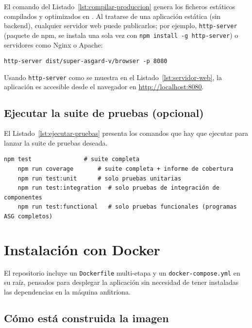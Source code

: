 \documentclass[../main.tex]{subfiles}
\begin{document}
El comando del Listado~\ref{lst:compilar-produccion} genera los ficheros estáticos compilados y optimizados en . Al tratarse de una aplicación estática (sin backend), cualquier servidor web puede publicarlos; por ejemplo, \texttt{http-server} (paquete de npm, se instala una sola vez con \texttt{npm install -g http-server}) o servidores como Nginx o Apache:

\begin{lstlisting}[caption={Comando para iniciar un servidor web.},label={lst:servidor-web}]
	http-server dist/super-asgard-v/browser -p 8080
\end{lstlisting}

Usando \texttt{http-server} como se muestra en el Listado~\ref{lst:servidor-web}, la aplicación es accesible desde el navegador en \url{http://localhost:8080}.

\subsection{Ejecutar la suite de pruebas (opcional)}

El Listado~\ref{lst:ejecutar-pruebas} presenta los comandos que hay que ejecutar para lanzar la suite de pruebas deseada.

\begin{lstlisting}[caption={Comandos para ejecutar la suite de pruebas.},label={lst:ejecutar-pruebas}]
	npm test               # suite completa
	npm run coverage       # suite completa + informe de cobertura
	npm run test:unit      # solo pruebas unitarias
	npm run test:integration  # solo pruebas de integración de componentes
	npm run test:functional   # solo pruebas funcionales (programas ASG completos)
\end{lstlisting}

\section{Instalación con Docker}

El repositorio incluye un \texttt{Dockerfile} multi-etapa y un \texttt{docker-compose.yml} en su raíz, pensados para desplegar la aplicación sin necesidad de tener instaladas las dependencias en la máquina anfitriona.

\subsection{Cómo está construida la imagen}
\end{document}
